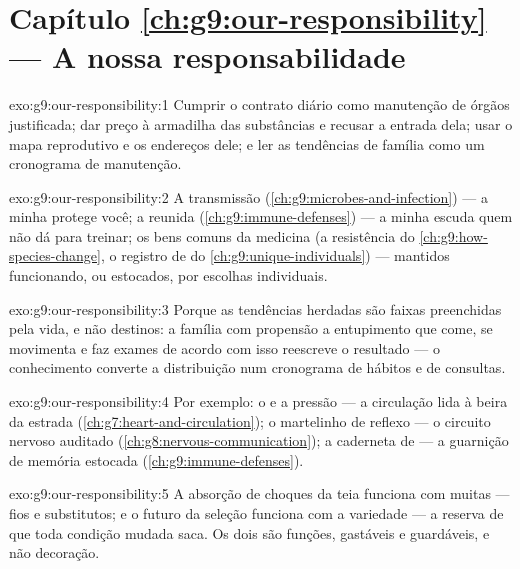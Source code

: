 \section*{Capítulo \ref{ch:g9:our-responsibility} --- A nossa responsabilidade}

\begin{solution}{exo:g9:our-responsibility:1}
Cumprir o contrato diário como manutenção de órgãos
justificada; dar preço à armadilha das substâncias e recusar
a entrada dela; usar o mapa reprodutivo e os endereços dele;
e ler as tendências de família como um cronograma de
manutenção.
\end{solution}

\begin{solution}{exo:g9:our-responsibility:2}
A transmissão (\cref{ch:g9:microbes-and-infection}) --- a
minha  protege você; a  reunida
(\cref{ch:g9:immune-defenses}) --- a minha  escuda
quem não dá para treinar; os bens comuns da medicina (a
resistência do \cref{ch:g9:how-species-change}, o registro de
 do \cref{ch:g9:unique-individuals}) --- mantidos
funcionando, ou estocados, por escolhas individuais.
\end{solution}

\begin{solution}{exo:g9:our-responsibility:3}
Porque as tendências herdadas são faixas preenchidas pela
vida, e não destinos: a família com propensão a entupimento
que come, se movimenta e faz exames de acordo com isso
reescreve o resultado --- o conhecimento converte a
distribuição num cronograma de hábitos e de consultas.
\end{solution}

\begin{solution}{exo:g9:our-responsibility:4}
Por exemplo: o  e a pressão --- a circulação lida à
beira da estrada (\cref{ch:g7:heart-and-circulation}); o
martelinho de reflexo --- o circuito nervoso auditado
(\cref{ch:g8:nervous-communication}); a caderneta de
 --- a guarnição de memória estocada
(\cref{ch:g9:immune-defenses}).
\end{solution}

\begin{solution}{exo:g9:our-responsibility:5}
A absorção de choques da teia funciona com muitas 
--- fios e substitutos; e o futuro da seleção funciona com a
variedade --- a reserva de que toda condição mudada saca. Os
dois são funções, gastáveis e guardáveis, e não decoração.
\end{solution}

